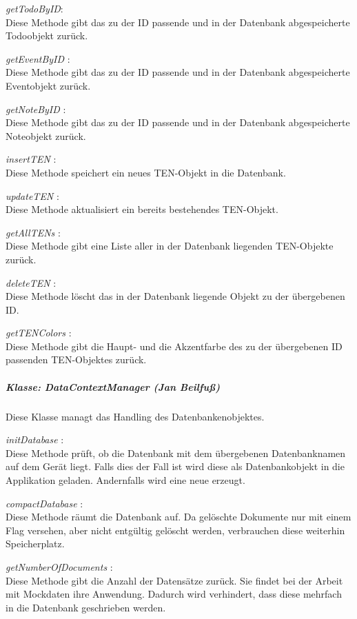 \textit{ getTodoByID}:\\
Diese Methode gibt das zu der ID passende und in der Datenbank abgespeicherte Todoobjekt zurück. 

\textit{ getEventByID }:\\
Diese Methode gibt das zu der ID passende und in der Datenbank abgespeicherte Eventobjekt zurück. 

\textit{ getNoteByID }:\\
Diese Methode gibt das zu der ID passende und in der Datenbank abgespeicherte Noteobjekt zurück. 

\textit{ insertTEN }:\\
Diese Methode speichert ein neues TEN-Objekt in die Datenbank.

\textit{ updateTEN }:\\
Diese Methode aktualisiert ein bereits bestehendes TEN-Objekt.

\textit{ getAllTENs }:\\
Diese Methode gibt eine Liste aller in der Datenbank liegenden TEN-Objekte zurück.

\textit{ deleteTEN }:\\
Diese Methode löscht das in der Datenbank liegende Objekt zu der übergebenen ID.

\textit{ getTENColors }:\\
Diese Methode gibt die Haupt- und die Akzentfarbe des zu der übergebenen ID passenden TEN-Objektes zurück.

\subparagraph{ Klasse: DataContextManager (Jan Beilfuß)}
Diese Klasse managt das Handling des Datenbankenobjektes.

\textit{ initDatabase }:\\
Diese Methode prüft, ob die Datenbank mit dem übergebenen Datenbanknamen auf dem Gerät liegt. Falls dies der Fall ist wird diese als Datenbankobjekt in die Applikation geladen. Andernfalls wird eine neue erzeugt.

\textit{ compactDatabase }:\\
Diese Methode räumt die Datenbank auf. Da gelöschte Dokumente nur mit einem Flag versehen, aber nicht entgültig gelöscht werden, verbrauchen diese weiterhin Speicherplatz.

\textit{ getNumberOfDocuments }:\\
Diese Methode gibt die Anzahl der Datensätze zurück. Sie findet bei der Arbeit mit Mockdaten ihre Anwendung. Dadurch wird verhindert, dass diese mehrfach in die Datenbank geschrieben werden.

